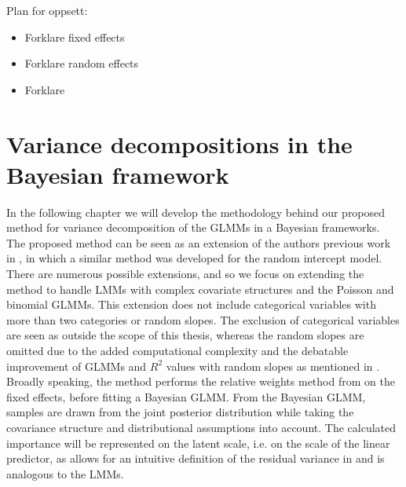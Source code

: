 
Plan for oppsett:

\begin{itemize}
    \item Forklare fixed effects
    \item Forklare random effects
    \item Forklare 
\end{itemize}

\section{Variance decompositions in the Bayesian framework}
In the following chapter we will develop the methodology behind our proposed method for variance decomposition of the GLMMs in a Bayesian frameworks.
The proposed method can be seen as an extension of the authors previous work in \citet{Arnstad}, in which a similar method was developed for the random intercept model.
There are numerous possible extensions, and so we focus on extending the method to handle LMMs with complex covariate structures and the Poisson and binomial GLMMs.
This extension does not include categorical variables with more than two categories or random slopes. 
The exclusion of categorical variables are seen as outside the scope of this thesis, whereas the random slopes are omitted due to the added computational complexity and the debatable improvement of GLMMs and $R^2$ values with random slopes as mentioned in \citet{Johnson2014}.
Broadly speaking, the method performs the relative weights method from \citet{johnson_relative_weights} on the fixed effects, before fitting a Bayesian GLMM.
From the Bayesian GLMM, samples are drawn from the joint posterior distribution while taking the covariance structure and distributional assumptions into account.
The calculated importance will be represented on the latent scale, i.e. on the scale of the linear predictor, as allows for an intuitive definition of the residual variance in \citet{nakagawa2013general} and is analogous to the LMMs.


